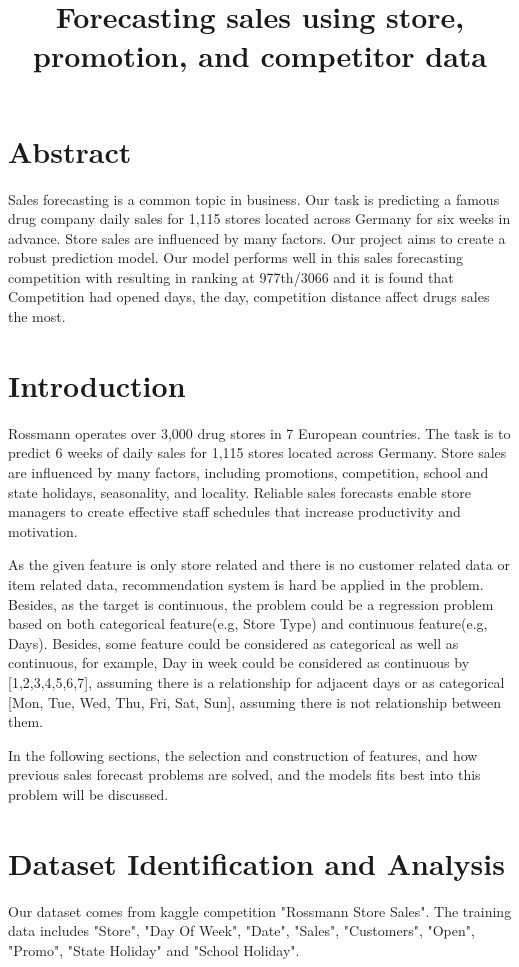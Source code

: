 \documentclass[jou,apacite]{apa6}
\title{Forecasting sales using store, promotion, and competitor data}
\begin{document}
\maketitle    
                        
\section{Abstract}
Sales forecasting is a common topic in business. Our task is predicting a famous drug company daily sales for 1,115 stores located across Germany for six weeks in advance. Store sales are influenced by many factors. Our project aims to create a robust prediction model. Our model performs well in this sales forecasting competition with resulting in ranking at 977th/3066 and it is found that Competition had opened days, the day, competition distance affect drugs sales the most. 

\section{Introduction}

Rossmann operates over 3,000 drug stores in 7 European countries. The task is to predict 6 weeks of daily sales for 1,115 stores located across Germany. Store sales are influenced by many factors, including promotions, competition, school and state holidays, seasonality, and locality.  Reliable sales forecasts enable store managers to create effective staff schedules that increase productivity and motivation. 

As the given feature is only store related and there is no customer related data or item related data, recommendation system is hard be applied in the problem. Besides, as the target is continuous, the problem could be a regression problem based on both categorical feature(e.g, Store Type) and continuous feature(e.g, Days). Besides, some feature could be considered as categorical as well as continuous, for example, Day in week could be considered as continuous by [1,2,3,4,5,6,7], assuming there is a relationship for adjacent days or as categorical [Mon, Tue, Wed, Thu, Fri, Sat, Sun], assuming there is not relationship between them.

In the following sections, the selection and construction of features, and how previous sales forecast problems are solved, and the models fits best into this problem will be discussed.

\section{Dataset Identification and Analysis}
Our dataset comes from kaggle competition "Rossmann Store Sales". The training data includes "Store", "Day Of Week", "Date", "Sales", "Customers", "Open", "Promo", "State Holiday" and "School Holiday". 
\end{document}
